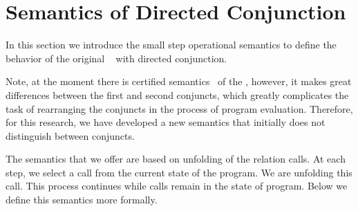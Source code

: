 \section{Semantics of Directed Conjunction}
In this section we introduce the small step operational semantics to define the behavior of the original \mk~ with directed conjunction. 


Note, at the moment there is certified semantics~\cite{fair:semantics} of the \mk, however, it makes great differences between the first and second conjuncts, which greatly complicates the task of rearranging the conjuncts in the process of program evaluation. 
Therefore, for this research, we have developed a new semantics that initially does not distinguish between conjuncts.


The semantics that we offer are based on unfolding of the relation calls.
At each step, we select a call from the current state of the program. 
We are unfolding this call.
This process continues while calls remain in the state of program. 
Below we define this semantics more formally.


